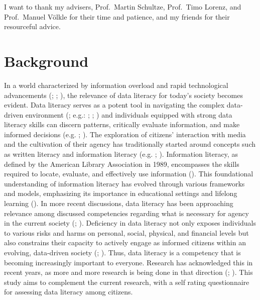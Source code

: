 \documentclass[
  12pt,
  a4paper,
  twoside]{article}
\begin{document}
I want to thank my advisers, Prof.~Martin Schultze, Prof.~Timo Lorenz, and Prof.~Manuel Völkle for their time and patience, and my friends for their resourceful advice.

\newpage\null\thispagestyle{empty}\newpage

\section{Background}\label{background}

In a world characterized by information overload and rapid technological advancements (; ; ), the relevance of data literacy for today's society becomes evident. Data literacy serves as a potent tool in navigating the complex data-driven environment (; e.g.: ; ; ) and individuals equipped with strong data literacy skills can discern patterns, critically evaluate information, and make informed decisions (e.g. ; ).
The exploration of citizens' interaction with media and the cultivation of their agency has traditionally started around concepts such as written literacy and information literacy (e.g. ; ). Information literacy, as defined by the American Library Association in 1989, encompasses the skills required to locate, evaluate, and effectively use information (). This foundational understanding of information literacy has evolved through various frameworks and models, emphasizing its importance in educational settings and lifelong learning (). In more recent discussions, data literacy has been approaching relevance among discussed competencies regarding what is necessary for agency in the current society (; ). Deficiency in data literacy not only exposes individuals to various risks and harms on personal, social, physical, and financial levels but also constrains their capacity to actively engage as informed citizens within an evolving, data-driven society (; ). Thus, data literacy is a competency that is becoming increasingly important to everyone. Research has acknowledged this in recent years, as more and more research is being done in that direction (; ). This study aims to complement the current research, with a self rating questionnaire for assessing data literacy among citizens.
\end{document}
